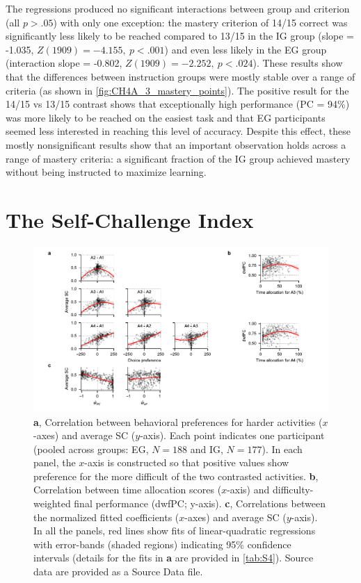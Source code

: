 \begin{subappendices}
The regressions produced no significant interactions between group and criterion (all $p > .05$) with only one exception: the mastery criterion of 14/15 correct was significantly less likely to be reached compared to 13/15 in the \ac{IG} group (slope = -1.035, $Z(1909) = -4.155,\ p < .001$) and even less likely in the \ac{EG} group (interaction slope = -0.802, $Z(1909) = -2.252,\ p < .024$). These results show that the differences between instruction groups were mostly stable over a range of criteria (as shown in \cref{fig:CH4A_3_mastery_points}). The positive result for the 14/15 vs 13/15 contrast shows that exceptionally high performance (\ac{PC} = 94\%) was more likely to be reached on the easiest task and that \ac{EG} participants seemed less interested in reaching this level of accuracy. Despite this effect, these mostly nonsignificant results show that an important observation holds across a range of mastery criteria: a significant fraction of the \ac{IG} group achieved mastery without being instructed to maximize learning.


\section{The Self-Challenge Index}\label{CH4A_S_self_challenge_index} 

\begin{figure}[bh!]
    \centering
    \includegraphics[width=1.1\textwidth]{Figures/c4/fig_s4.pdf}
    \caption[short Appendix figure description]{\textbf{a}, Correlation between behavioral preferences for harder activities ($x$-axes) and average SC ($y$-axis). Each point indicates one participant (pooled across groups: \ac{EG}, $N=188$ and \ac{IG}, $N=177$). In each panel, the $x$-axis is constructed so that positive values show preference for the more difficult of the two contrasted activities. \textbf{b}, Correlation between time allocation scores ($x$-axis) and difficulty-weighted final performance (\ac{dwfPC}; y-axis). \textbf{c}, Correlations between the normalized fitted coefficients ($x$-axes) and average SC ($y$-axis). In all the panels, red lines show fits of linear-quadratic regressions with error-bands (shaded regions) indicating 95\% confidence intervals (details for the fits in \textbf{a} are provided in \cref{tab:S4}). Source data are provided as a Source Data file.}
    \label{fig:CH4A_4_self_challenge_index}
\end{figure}


\end{subappendices}
